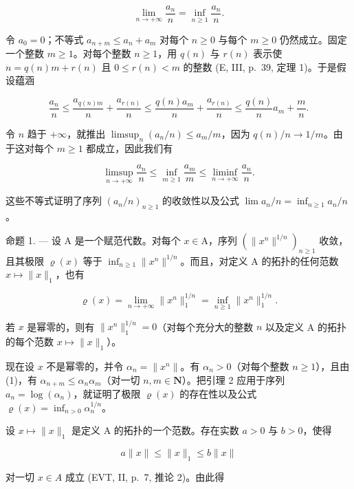 \[
\lim _ {n \to + \infty} \frac {a _ {n}}{n} = \inf _ {n \geqslant 1} \frac {a _ {n}}{n}.
\]

令 \(a_0 = 0\)；不等式 \(a_{n+m} \leqslant a_n + a_m\) 对每个 \(n \geqslant 0\) 与每个 \(m \geqslant 0\) 仍然成立。固定一个整数 \(m \geqslant 1\)。对每个整数 \(n \geqslant 1\)，用 \(q(n)\) 与 \(r(n)\) 表示使 \(n = q(n)m + r(n)\) 且 \(0 \leqslant r(n) < m\) 的整数 (E, III, p.~39, 定理 1)。于是假设蕴涵

\[
\frac {a _ {n}}{n} \leqslant \frac {a _ {q (n) m}}{n} + \frac {a _ {r (n)}}{n} \leqslant \frac {q (n) a _ {m}}{n} + \frac {a _ {r (n)}}{n} \leqslant \frac {q (n)}{n} a _ {m} + \frac {m}{n}.
\]

令 \(n\) 趋于 \(+\infty\)，就推出 \(\limsup_{n}(a_{n}/n) \leqslant a_{m}/m\)，因为 \(q(n)/n \to 1/m\)。由于这对每个 \(m \geqslant 1\) 都成立，因此我们有

\[
\limsup _ {n \to + \infty} \frac {a _ {n}}{n} \leqslant \inf _ {m \geqslant 1} \frac {a _ {m}}{m} \leqslant \liminf _ {n \to + \infty} \frac {a _ {n}}{n}.
\]

这些不等式证明了序列 \((a_{n}/n)_{n\geqslant1}\) 的收敛性以及公式 \(\lim a_{n}/n = \inf_{n\geqslant1} a_{n}/n\)。

命题 1. --- 设 A 是一个赋范代数。对每个 \(x \in \mathrm{A}\)，序列 \((\|x^n\|^{1/n})_{n \geqslant 1}\) 收敛，且其极限 \(\varrho(x)\) 等于 \(\inf_{n \geqslant 1} \|x^n\|^{1/n}\)。而且，对定义 A 的拓扑的任何范数 \(x \mapsto \|x\|_1\)，也有

\[
\varrho (x) = \lim _ {n \to + \infty} \| x ^ {n} \| _ {1} ^ {1 / n} = \inf _ {n \geqslant 1} \| x ^ {n} \| _ {1} ^ {1 / n}.
\]

若 \(x\) 是幂零的，则有 \(\| x^n\| _1^{1 / n} = 0\)（对每个充分大的整数 \(n\) 以及定义 A 的拓扑的每个范数 \(x\mapsto \| x\| _1\)）。

现在设 \(x\) 不是幂零的，并令 \(\alpha_{n} = \| x^{n}\|\)。有 \(\alpha_{n} > 0\)（对每个整数 \(n \geqslant 1\)），且由 (1)，有 \(\alpha_{n + m} \leqslant \alpha_{n}\alpha_{m}\)（对一切 \(n, m \in \mathbf{N}\)）。把引理 2 应用于序列 \(a_n = \log(\alpha_n)\)，就证明了极限 \(\varrho(x)\) 的存在性以及公式 \(\varrho(x) = \inf_{n > 0} \alpha_n^{1/n}\)。

设 \(x \mapsto \|x\|_1\) 是定义 A 的拓扑的一个范数。存在实数 \(a > 0\) 与 \(b > 0\)，使得

\[
a \| x \| \leqslant \| x \| _ {1} \leqslant b \| x \|
\]

对一切 \(x \in A\) 成立 (EVT, II, p.~7, 推论 2)。由此得

